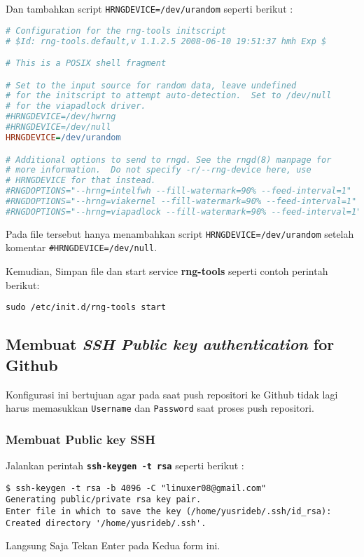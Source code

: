 \noindent
Dan tambahkan script \texttt{HRNGDEVICE=/dev/urandom} seperti berikut :

\begin{lstlisting}[language=Ini]
# Configuration for the rng-tools initscript
# $Id: rng-tools.default,v 1.1.2.5 2008-06-10 19:51:37 hmh Exp $

# This is a POSIX shell fragment

# Set to the input source for random data, leave undefined
# for the initscript to attempt auto-detection.  Set to /dev/null
# for the viapadlock driver.
#HRNGDEVICE=/dev/hwrng
#HRNGDEVICE=/dev/null
HRNGDEVICE=/dev/urandom

# Additional options to send to rngd. See the rngd(8) manpage for
# more information.  Do not specify -r/--rng-device here, use
# HRNGDEVICE for that instead.
#RNGDOPTIONS="--hrng=intelfwh --fill-watermark=90% --feed-interval=1"
#RNGDOPTIONS="--hrng=viakernel --fill-watermark=90% --feed-interval=1"
#RNGDOPTIONS="--hrng=viapadlock --fill-watermark=90% --feed-interval=1"
\end{lstlisting}

\noindent
Pada file tersebut hanya menambahkan script \texttt{HRNGDEVICE=/dev/urandom} setelah 
komentar \texttt{\#HRNGDEVICE=/dev/null}.

\noindent
Kemudian, Simpan file dan start service \textbf{rng-tools} seperti contoh perintah berikut:

\begin{lstlisting}[language=ShellBash]
sudo /etc/init.d/rng-tools start
\end{lstlisting}

\subsection{Membuat \textit{SSH Public key authentication} for Github}
\noindent
\normalsize
Konfigurasi ini bertujuan agar pada saat push repositori ke Github tidak lagi harus memasukkan \texttt{Username} dan \texttt{Password} saat proses push repositori.

\subsubsection{Membuat Public key SSH}
\noindent
Jalankan perintah \texttt{\textbf{ssh-keygen -t rsa}} seperti berikut :

\begin{lstlisting}[language=ShellBash]
$ ssh-keygen -t rsa -b 4096 -C "linuxer08@gmail.com"
Generating public/private rsa key pair.
Enter file in which to save the key (/home/yusrideb/.ssh/id_rsa): 
Created directory '/home/yusrideb/.ssh'.

\end{lstlisting}
\noindent
Langsung Saja Tekan Enter pada Kedua form ini.

